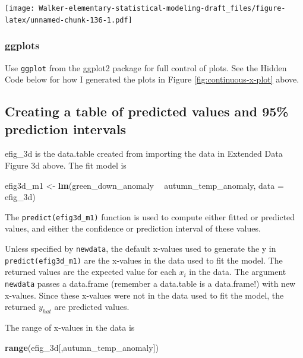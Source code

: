 \documentclass[]{book}
\newenvironment{Shaded}{\begin{snugshade}}{\end{snugshade}}
\newcommand{\DataTypeTok}[1]{\textcolor[rgb]{0.13,0.29,0.53}{#1}}
\newcommand{\KeywordTok}[1]{\textcolor[rgb]{0.13,0.29,0.53}{\textbf{#1}}}
\newcommand{\NormalTok}[1]{#1}
\newcommand{\OperatorTok}[1]{\textcolor[rgb]{0.81,0.36,0.00}{\textbf{#1}}}
\newcommand{\StringTok}[1]{\textcolor[rgb]{0.31,0.60,0.02}{#1}}
\begin{document}
\texttt{[image: Walker-elementary-statistical-modeling-draft\_files/figure-latex/unnamed-chunk-136-1.pdf]}

\hypertarget{ggplots}{%
\subsubsection{ggplots}\label{ggplots}}

Use \texttt{ggplot} from the ggplot2 package for full control of plots. See the Hidden Code below for how I generated the plots in Figure \ref{fig:continuous-x-plot} above.

\hypertarget{creating-a-table-of-predicted-values-and-95-prediction-intervals}{%
\subsection{Creating a table of predicted values and 95\% prediction intervals}\label{creating-a-table-of-predicted-values-and-95-prediction-intervals}}

efig\_3d is the data.table created from importing the data in Extended Data Figure 3d above. The fit model is

\begin{Shaded}
\begin{Highlighting}[]
\NormalTok{efig3d_m1 <-}\StringTok{ }\KeywordTok{lm}\NormalTok{(green_down_anomaly }\OperatorTok{~}\StringTok{ }\NormalTok{autumn_temp_anomaly, }\DataTypeTok{data =}\NormalTok{ efig_3d)}
\end{Highlighting}
\end{Shaded}

The \texttt{predict(efig3d\_m1)} function is used to compute either fitted or predicted values, and either the confidence or prediction interval of these values.

Unless specified by \texttt{newdata}, the default x-values used to generate the y in \texttt{predict(efig3d\_m1)} are the x-values in the data used to fit the model. The returned values are the expected value for each \(x_i\) in the data. The argument \texttt{newdata} passes a data.frame (remember a data.table is a data.frame!) with new x-values. Since these x-values were not in the data used to fit the model, the returned \(y_{hat}\) are predicted values.

The range of x-values in the data is

\begin{Shaded}
\begin{Highlighting}[]
\KeywordTok{range}\NormalTok{(efig_3d[,autumn_temp_anomaly])}
\end{Highlighting}
\end{Shaded}
\end{document}
